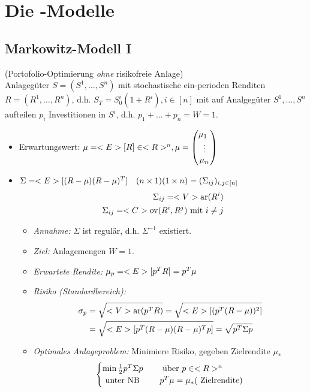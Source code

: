 \section{Die -Modelle}
\subsection*{Markowitz-Modell I}
(Portofolio-Optimierung \emph{ohne} risikofreie Anlage)\\
Anlagegüter $S = (S^1, \dots, S^n)$ mit stochastische ein-perioden Renditen $R = (R^1, \dots, R^n)$, d.h. $S_T = S_0^i(1+R^i), i \in [n]$ mit auf Analgegüter $S^1, \dots, S^n$ aufteilen $p_i$ Investitionen in $S^i$, d.h. $p_1 + \dots + p_n = W = 1$.
\begin{itemize}
	\item Erwartungswert: $\mu = <E>[R] \in <R>^n, \mu = \begin{pmatrix}
		\mu_1\ \\ \vdots \\ \mu_n
	\end{pmatrix}$
	\item $\Sigma = <E>[(R-\mu)(R-\mu)^T]\quad (n\times 1)(1\times n) = (\Sigma_{ij})_{i,j \in [n]}$
	\begin{align*}
		\Sigma_{ij} = <V>\text{ar}(R^i)\\
		\Sigma_{ij} = <C>\text{ov}(R^{i},R^j) \text{ mit } i \neq j
	\end{align*}
	\begin{itemize}
		\item \emph{Annahme:} $\Sigma$ ist regulär, d.h. $\Sigma^{-1}$ existiert.
		\item \emph{Ziel:} Anlagemengen $W=1$. 
		\item \emph{Erwartete Rendite:} $\mu_p = <E>[p^T R] = p^T \mu$
		\item \emph{Risiko (Standardbereich):}
		\begin{align*}
			\sigma_p &= \sqrt{<V>\text{ar}(p^T R)} = \sqrt{<E>[(p^T (R-\mu))^2]}\\
			&=\sqrt{<E>[p^T (R-\mu)(R-\mu)^Tp]} = \sqrt{p^T \Sigma p}
		\end{align*}
		\item \emph{Optimales Anlageproblem:} Minimiere Risiko, gegeben Zielrendite $\mu_{\ast}$
		\begin{align*}
			\begin{cases}
				\min \frac{1}{2} p^T \Sigma p & \quad\text{ über } p \in <R>^n\\
				\text{ unter NB} &\quad p^T \mu = \mu_{\ast} (\text{ Zielrendite})\\

\end{cases}
\end{align*}
\end{itemize}
\end{itemize}
